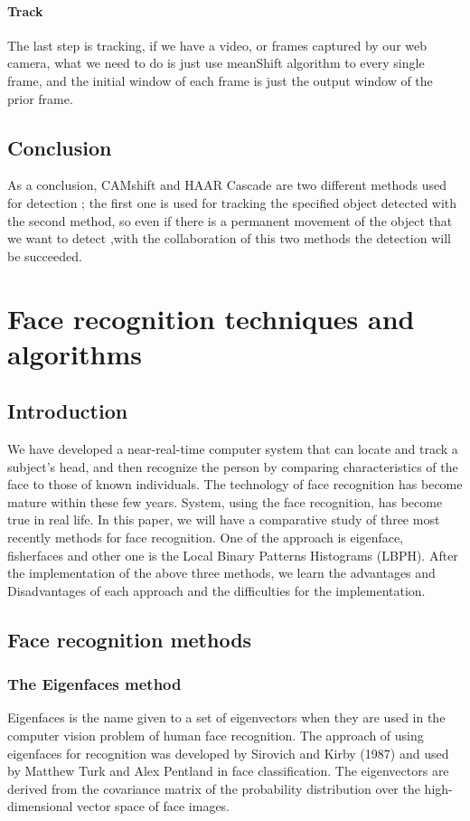 \documentclass[a4paper,12pt]{report}
\begin{document}
    \subsubsection{Track}

    The last step is tracking, if we have a video, or frames captured by our web camera, what we need to do is just use meanShift algorithm to every single frame, and the initial window of each frame is just the output window of the prior frame.
    
    \section{Conclusion}
    As a conclusion, CAMshift and HAAR Cascade are two different methods used for detection ; the first one is used for tracking the specified object detected with the second method, so even if there is a permanent movement of the object that we want to detect ,with the collaboration of this two methods the detection will be succeeded.
    
\chapter{Face recognition techniques and algorithms}  
	\section{Introduction}
	We have developed a near-real-time computer system that can locate and track a subject's head, and then recognize the person by comparing characteristics of the face to those of known individuals. The technology of face recognition has become mature within these few years. System, using the face recognition, has become true in real life. In this paper, we will have a comparative study of three most recently methods for face recognition. One of the approach is eigenface, fisherfaces and other one is the Local Binary Patterns Histograms (LBPH). After the implementation of the above three methods, we learn the advantages and Disadvantages of each approach and the difficulties for the implementation.
	
	\section{Face recognition methods}
		\subsection{The Eigenfaces method}
		  Eigenfaces is the name given to a set of eigenvectors when they are used in the computer vision problem of human face recognition. The approach of using eigenfaces for recognition was developed by Sirovich and Kirby (1987) and used by Matthew Turk and Alex Pentland in face classification. The eigenvectors are derived from the covariance matrix of the probability distribution over the high-dimensional vector space of face images.
		  
\end{document}
